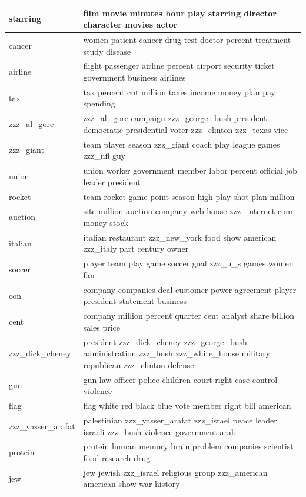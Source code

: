 \documentclass{article}
\begin{document}
\begin{tabular}{ l | l }
    starring & film movie minutes hour play starring director character movies actor \\ \hline 
    cancer & women patient cancer drug test doctor percent treatment study disease \\ \hline 
    airline & flight passenger airline percent airport security ticket government business airlines \\ \hline 
    tax & tax percent cut million taxes income money plan pay spending \\ \hline 
    zzz\_al\_gore & zzz\_al\_gore campaign zzz\_george\_bush president democratic presidential voter zzz\_clinton zzz\_texas vice \\ \hline 
    zzz\_giant & team player season zzz\_giant coach play league games zzz\_nfl guy \\ \hline 
    union & union worker government member labor percent official job leader president \\ \hline 
    rocket & team rocket game point season high play shot plan million \\ \hline 
    auction & site million auction company web house zzz\_internet com money stock \\ \hline 
    italian & italian restaurant zzz\_new\_york food show american zzz\_italy part century owner \\ \hline 
    soccer & player team play game soccer goal zzz\_u\_s games women fan \\ \hline 
    con & company companies deal customer power agreement player president statement business \\ \hline 
    cent & company million percent quarter cent analyst share billion sales price \\ \hline 
    zzz\_dick\_cheney & president zzz\_dick\_cheney zzz\_george\_bush administration zzz\_bush zzz\_white\_house military republican zzz\_clinton defense \\ \hline 
    gun & gun law officer police children court right case control violence \\ \hline 
    flag & flag white red black blue vote member right bill american \\ \hline 
    zzz\_yasser\_arafat & palestinian zzz\_yasser\_arafat zzz\_israel peace leader israeli zzz\_bush violence government arab \\ \hline 
    protein & protein human memory brain problem companies scientist food research drug \\ \hline 
    jew & jew jewish zzz\_israel religious group zzz\_american american show war history \\ \hline 

\end{tabular}
\end{document}
